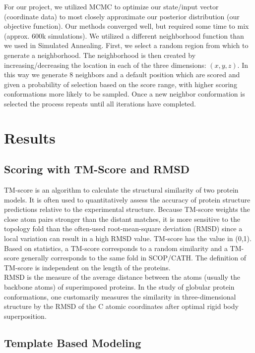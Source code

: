 \documentclass{article}
\begin{document}
For our project, we utilized MCMC to optimize our state/input vector (coordinate data) to most closely approximate our posterior distribution (our objective function).  Our methods converged well, but required some time to mix (approx. 600k simulations).  We utilized a different neighborhood function than we used in Simulated Annealing.  First, we select a random region from which to generate a neighborhood. The neighborhood is then created by increasing/decreasing the location in each of the three dimensions: $(x, y, z)$. In this way we generate 8 neighbors and a default position which are scored and given a probability of selection based on the score range, with higher scoring conformations more likely to be sampled. Once a new neighbor conformation is selected the process repeats until all iterations have completed.


\section{Results}

\subsection{Scoring with TM-Score and RMSD}

TM-score is an algorithm to calculate the structural similarity of two protein models. It is often used to quantitatively assess the accuracy of protein structure predictions relative to the experimental structure. Because TM-score weights the close atom pairs stronger than the distant matches, it is more sensitive to the topology fold than the often-used root-mean-square deviation (RMSD) since a local variation can result in a high RMSD value. TM-score has the value in (0,1). Based on statistics, a TM-score  corresponds to a random similarity and a TM-score  generally corresponds to the same fold in SCOP/CATH. The definition of TM-score is independent on the length of the proteins.\\

RMSD is the measure of the average distance between the atoms (usually the backbone atoms) of superimposed proteins. In the study of globular protein conformations, one customarily measures the similarity in three-dimensional structure by the RMSD of the C atomic coordinates after optimal rigid body superposition.


\subsection{Template Based Modeling}
\end{document}
